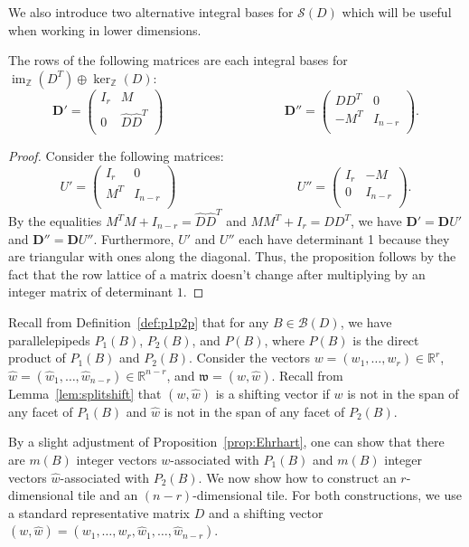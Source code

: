 \documentclass[ALCO,ThmDefs,Unicode,epreuves]{cedram}
\newcommand{\R}{\mathbb{R}}
\newcommand{\Z}{\mathbb{Z}}
\newcommand{\D}{\mathbf{D}}
\newcommand{\B}{\mathcal{B}}
\newcommand{\Sand}{\mathcal{S}}
\newcommand{\w}{\mathfrak w}
\DeclareMathOperator{\Ima}{im}
\begin{document}
We also introduce two alternative integral bases for $\Sand(D)$ which will be useful when working in lower dimensions. 
\begin{prop}\label{prop:otherbases}
The rows of the following matrices are each integral bases for $\Ima_\Z(D^T) \oplus \ker_\Z(D)$:
\[
\D' = \begin{pmatrix}
I_r & M\\
0 & \widehat D \widehat D^T\\
\end{pmatrix}
\hspace{4cm}
\D'' = \begin{pmatrix}
D D^T & 0\\
-M^T & I_{n-r}\\
\end{pmatrix}.
\]
\end{prop}

\begin{proof}
Consider the following matrices:
\[
U' = \begin{pmatrix}
I_r & 0\\
M^T & I_{n-r}\\
\end{pmatrix}
\hspace{4cm}
U'' = \begin{pmatrix}
I_r & -M\\
0 & I_{n-r}\\
\end{pmatrix}.
\]
By the equalities $M^T M + I_{n-r} = \widehat D \widehat D^T$ and $M M^T + I_r = D D^T$, we have $\D' = \D U'$ and $\D'' = \D U''$. Furthermore, $U'$ and $U''$ each have determinant 1 because they are triangular with ones along the diagonal. Thus, the proposition follows by the fact that the row lattice of a matrix doesn't change after multiplying by an integer matrix of determinant $1$. 
\end{proof}

Recall from Definition~\ref{def:p1p2p} that for any $B \in \B(D)$, we have parallelepipeds $P_1(B)$, $P_2(B)$, and $P(B)$, where $P(B)$ is the direct product of $P_1(B)$ and $P_2(B)$. Consider the vectors $w = (w_1,\dots,w_r) \in \R^r$, $\widehat w = (\widehat w_1,\dots, \widehat w_{n-r})\in \R^{n-r}$, and $\w = (w,\widehat w)$. Recall from Lemma~\ref{lem:splitshift} that $(w,\widehat w)$ is a shifting vector if $w$ is not in the span of any facet of $P_1(B)$ and $\widehat w$ is not in the span of any facet of $P_2(B)$. 

By a slight adjustment of Proposition~\ref{prop:Ehrhart}, one can show that there are $m(B)$ integer vectors $w$-associated with $P_1(B)$ and $m(B)$ integer vectors $\widehat w$-associated with $P_2(B)$. We now show how to construct an $r$-dimensional tile and an $(n-r)$-dimensional tile. For both constructions, we use a standard representative matrix $D$ and a shifting vector $(w,\widehat w) = (w_1,\dots, w_r, \widehat w_1,\dots, \widehat w_{n-r})$. 
\end{document}
